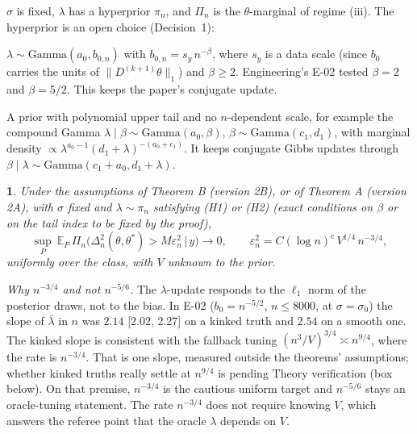 \documentclass[11pt]{article}
\newcommand{\E}{\mathbb{E}}
\newcommand{\norm}[1]{\lVert #1\rVert}
\newcommand{\Dk}{D^{(k+1)}}
\newcommand{\Post}{\Pi_n}
\theoremstyle{plain}
\newcommand{\mythmname}{}
\newtheorem*{namedx}{\mythmname}
\newenvironment{named}[1]{\renewcommand{\mythmname}{#1}\begin{namedx}}{\end{namedx}}
\theoremstyle{definition}
\theoremstyle{remark}
\begin{document}
$\sigma$ is fixed, $\lambda$ has a hyperprior $\pi_n$, and $\Post$ is the $\theta$-marginal of regime (iii). The hyperprior is an open choice (Decision~1):
\begin{description}[leftmargin=0pt]
\item[(H1) $n$-scaled Gamma.] $\lambda\sim\mathrm{Gamma}(a_0,b_{0,n})$ with $b_{0,n} = s_y\,n^{-\beta}$, where $s_y$ is a data scale (since $b_0$ carries the units of $\norm{\Dk\theta}_1$) and $\beta\ge2$. Engineering's E-02 tested $\beta=2$ and $\beta=5/2$. This keeps the paper's conjugate update.
\item[(H2) Polynomial-tailed prior.] A prior with polynomial upper tail and no $n$-dependent scale, for example the compound Gamma $\lambda\mid\beta\sim\mathrm{Gamma}(a_0,\beta)$, $\beta\sim\mathrm{Gamma}(c_1,d_1)$, with marginal density $\propto\lambda^{a_0-1}(d_1+\lambda)^{-(a_0+c_1)}$. It keeps conjugate Gibbs updates through $\beta\mid\lambda\sim\mathrm{Gamma}(c_1+a_0,d_1+\lambda)$.
\end{description}

\begin{named}{Target 2 (proposed)}
Under the assumptions of Theorem B (version 2B), or of Theorem A (version 2A), with $\sigma$ fixed and $\lambda\sim\pi_n$ satisfying (H1) or (H2) (exact conditions on $\beta$ or on the tail index to be fixed by the proof),
\[
\sup_{P}\ \E_P\,\Post\big(\Delta_n^2(\theta,\theta^*)>M\varepsilon_n^2\,\big|\,y\big)\to0, \qquad \varepsilon_n^2 = C(\log n)^{c}\,V^{1/4}\,n^{-3/4},
\]
uniformly over the class, with $V$ unknown to the prior.
\end{named}

\noindent\textit{Why $n^{-3/4}$ and not $n^{-5/6}$.} The $\lambda$-update responds to the $\ell_1$ norm of the posterior draws, not to the bias. In E-02 ($b_0=n^{-5/2}$, $n\le8000$, at $\sigma=\sigma_0$) the slope of $\bar\lambda$ in $n$ was $2.14$ [2.02, 2.27] on a kinked truth and $2.54$ on a smooth one. The kinked slope is consistent with the fallback tuning $(n^3/V)^{3/4}\asymp n^{9/4}$, where the rate is $n^{-3/4}$. That is one slope, measured outside the theorems' assumptions; whether kinked truths really settle at $n^{9/4}$ is pending Theory verification (box below). On that premise, $n^{-3/4}$ is the cautious uniform target and $n^{-5/6}$ stays an oracle-tuning statement. The rate $n^{-3/4}$ does not require knowing $V$, which answers the referee point that the oracle $\lambda$ depends on $V$.
\end{document}
